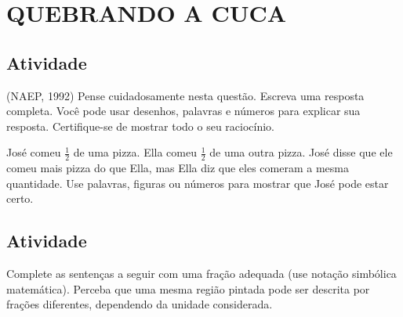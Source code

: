 \section{QUEBRANDO A CUCA }
\vspace*{-.4cm}


\subsection{Atividade}

(NAEP, 1992) Pense cuidadosamente nesta questão. Escreva uma resposta completa. Você pode usar desenhos, palavras e números para explicar sua resposta. Certifique-se de mostrar todo o seu raciocínio.

José comeu $\frac{1}{2}$ de uma pizza. Ella comeu $\frac{1}{2}$ de uma outra pizza. José disse que ele comeu mais pizza do que Ella, mas Ella diz que eles comeram a mesma quantidade. Use palavras, figuras ou números para mostrar que José pode estar certo.


\subsection{Atividade}

Complete as sentenças a seguir com uma fração adequada (use notação simbólica matemática). Perceba que uma mesma região pintada pode ser descrita por frações diferentes, dependendo da unidade considerada.

\def \tripinha{ (30:4) -- (90:4) -- (150:4)--(210:4)--(270:4)--(330:4) [shift={({4*sqrt(3)},0)}] --(270:4) -- (330:4) -- (30:4) -- (90:4)--(150:4)--cycle;}
\def \tripa{ (30:4) -- (90:4) -- (150:4)--(210:4)--(270:4)--(330:4) [shift={({4*sqrt(3)},0)}] --(270:4) -- (330:4) [shift={({4*sqrt(3)},0)}]--  (270:4) -- (330:4) -- (30:4) -- (90:4)--(150:4) [shift={({-4*sqrt(3)},0)}] -- (90:4) -- (150:4)--cycle;}

